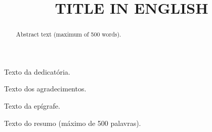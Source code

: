 \documentclass[openright]{normas-utf-tex} %
\title{\MakeUppercase{Title in English}} %
\begin{document}
\capa %
\folhaderosto %

\fichacatpgbib{\pageref{bibstart}-\pageref{bibend}}
\fichacat



\begin{dedicatoria}
Texto da dedicat\'oria.
\end{dedicatoria}

\begin{agradecimentos}
Texto dos agradecimentos.
\end{agradecimentos}

\begin{epigrafe}
Texto da ep\'igrafe.
\end{epigrafe}

\begin{resumo}
Texto do resumo (m\'aximo de 500 palavras).
\end{resumo}

\begin{abstract}
Abstract text (maximum of 500 words).
\end{abstract}

\listadefiguras %
\listadetabelas %
\listadequadros %
\listadesiglas %
\listadesimbolos %

\sumario %


%
%
%
%

\setcounter{page}{12}

\end{document}
